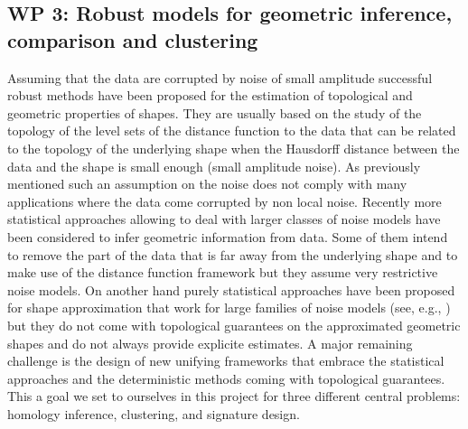 \subsection*{WP 3:  Robust models for geometric inference, comparison and  clustering}


%
%



Assuming that the data are corrupted by noise of small amplitude successful robust methods have been proposed for the estimation of topological and geometric  properties of shapes. They are usually based on the study of the topology of the level sets of the distance function to the data that can be related to the topology of the underlying shape when the Hausdorff distance  between the data and the shape is small enough (small amplitude noise). As previously mentioned such an assumption on the noise does not comply with many applications where the data come corrupted by non local noise. 
Recently more statistical approaches allowing to deal with larger classes of noise models have been considered to infer geometric information from data. Some of them intend to remove the part of the data that is far away from the underlying shape and to make use of  the distance function framework \cite{nsw-tvu-2011} but they assume very restrictive noise models. On another hand purely statistical approaches have been proposed for shape approximation that work for large families of noise models (see, e.g., \cite{gpvw-mme-2011,gpvw-mesd-2011}) but they do not come with topological guarantees on the approximated geometric shapes and do not always provide explicite estimates. A major remaining challenge is the design of new unifying frameworks that embrace the statistical approaches and the deterministic methods coming with topological guarantees.  
This a goal we set to ourselves in this project for three different central problems: homology inference, clustering, and signature design.


